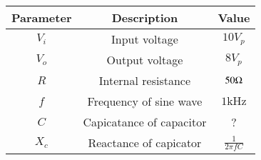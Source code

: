  \begin{tabular}{|c|c|c|}
        \hline
        \textbf{Parameter} & \textbf{Description} & \textbf{Value} \\
        \hline
        $V_i$ & Input voltage & $10V_p$  \\ \hline
        $V_o$ & Output voltage & $8V_p$ \\ \hline
        $R$ &Internal resistance & $50 \ohm$ \\ \hline
        $f$ &Frequency of sine wave & $1\text{kHz}$ \\ \hline
        $C$ & Capicatance of capacitor & ? \\ \hline
        $X_c$ & Reactance of capicator & $\frac{1}{2\pi fC}$ \\ \hline
        
    \end{tabular}

